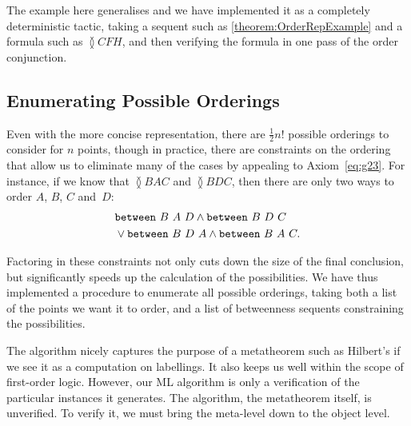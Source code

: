The example here generalises and we have implemented it as a completely deterministic tactic, taking a sequent such as \eqref{theorem:OrderRepExample} and a formula such as $\between{C}{F}{H}$, and then verifying the formula in one pass of the order conjunction.

\subsection{Enumerating Possible Orderings}
Even with the more concise representation, there are $\frac{1}{2}n!$ possible orderings to consider for $n$ points, though in practice, there are constraints on the ordering that allow us to eliminate many of the cases by appealing to Axiom~\ref{eq:g23}. For instance, if we know that $\between{B}{A}{C}$ and $\between{B}{D}{C}$, then there are only two ways to order $A$, $B$, $C$ and~$D$:
\begin{align*}
&\texttt{between}\ B\ A\ D\wedge\texttt{between}\ B\ D\ C\\
&\vee\texttt{between}\ B\ D\ A\wedge\texttt{between}\ B\ A\ C.
\end{align*}

Factoring in these constraints not only cuts down the size of the final conclusion, but significantly speeds up the calculation of the possibilities. We have thus implemented a procedure to enumerate all possible orderings, taking both a list of the points we want it to order, and a list of betweenness sequents constraining the possibilities.

The algorithm nicely captures the purpose of a metatheorem such as Hilbert's if we see it as a computation on labellings. It also keeps us well within the scope of first-order logic. However, our ML algorithm is only a verification of the particular instances it generates. The algorithm, the metatheorem itself, is unverified. To verify it, we must bring the meta-level down to the object level.

